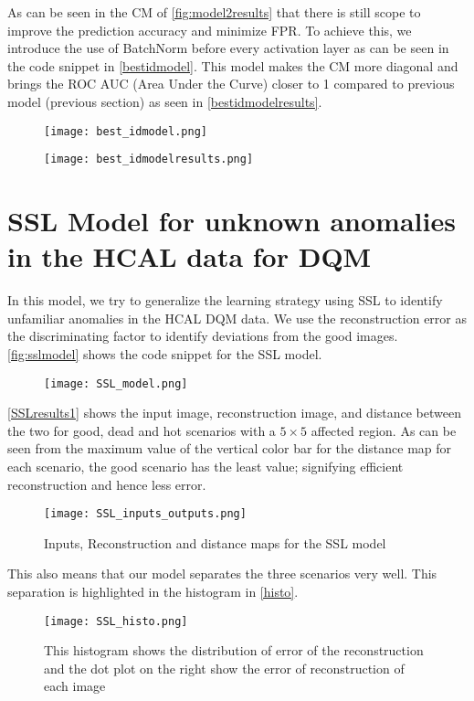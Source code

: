 As can be seen in the CM of \autoref{fig:model2results}  that there is still scope to improve the prediction accuracy and minimize FPR.
  To achieve this, we introduce the use of BatchNorm before every activation layer as can be seen in the code snippet in \autoref{bestidmodel}.
  This model makes the CM more diagonal and brings the ROC AUC (Area Under the Curve) closer to 1 compared to previous model (previous section) as seen in \autoref{bestidmodelresults}.


\begin{figure}
\texttt{[image: best\_idmodel.png]}
\caption{\label{bestidmodel}}
\end{figure}


\begin{figure}
\texttt{[image: best\_idmodelresults.png]}
\caption{\label{bestidmodelresults}}
\end{figure}

\section{SSL Model for unknown anomalies in the HCAL data for DQM}

In this model, we try to generalize the learning strategy using SSL to identify unfamiliar anomalies in the HCAL DQM data. We use the reconstruction error as the discriminating factor to identify deviations from the good images. \autoref{fig:sslmodel} shows the code snippet for the SSL model.

\begin{figure}
\texttt{[image: SSL\_model.png]}
\caption{\label{fig:sslmodel}}
\end{figure}

\autoref{SSLresults1} shows the input image, reconstruction image, and distance between the two for good, dead and hot scenarios with a $5\times5$ affected region. As can be seen from the maximum value of the vertical color bar for the distance map for each scenario, the good scenario has the least value; signifying efficient reconstruction and hence less error. 

\begin{figure}
\texttt{[image: SSL\_inputs\_outputs.png]}
\caption{Inputs, Reconstruction and distance maps for the SSL model\label{SSLresults1}}
\end{figure}

This also means that our model separates the three scenarios very well. This separation is highlighted in the histogram in \autoref{histo}. 


\begin{figure}
\texttt{[image: SSL\_histo.png]}
\caption{This histogram shows the distribution of error of the reconstruction and the dot plot on the right show the error of reconstruction of each image\label{histo}}
\end{figure}